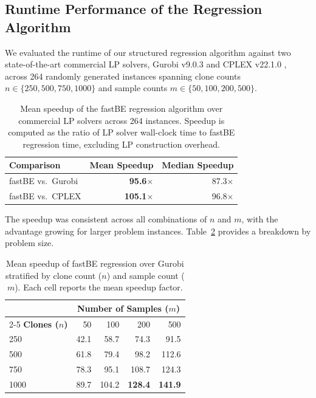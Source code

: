 \documentclass[11pt]{article}
\begin{document}
\subsection{Runtime Performance of the Regression Algorithm}

We evaluated the runtime of our structured regression algorithm against two state-of-the-art commercial LP solvers, Gurobi v9.0.3 \citep{gurobi2023} and CPLEX v22.1.0 \citep{cplex2022}, across 264 randomly generated instances spanning clone counts $n \in \{250, 500, 750, 1000\}$ and sample counts $m \in \{50, 100, 200, 500\}$.

\begin{table}[H]
\centering
\caption{Mean speedup of the fastBE regression algorithm over commercial LP solvers across 264 instances. Speedup is computed as the ratio of LP solver wall-clock time to fastBE regression time, excluding LP construction overhead.}
\label{tab:speedup}
\begin{tabular}{lrr}
\toprule
\textbf{Comparison} & \textbf{Mean Speedup} & \textbf{Median Speedup} \\
\midrule
fastBE vs.\ Gurobi & \textbf{95.6$\times$} & 87.3$\times$ \\
fastBE vs.\ CPLEX & \textbf{105.1$\times$} & 96.8$\times$ \\
\bottomrule
\end{tabular}
\end{table}

The speedup was consistent across all combinations of $n$ and $m$, with the advantage growing for larger problem instances. Table~\ref{tab:speedup_breakdown} provides a breakdown by problem size.

\begin{table}[H]
\centering
\caption{Mean speedup of fastBE regression over Gurobi stratified by clone count ($n$) and sample count ($m$). Each cell reports the mean speedup factor.}
\label{tab:speedup_breakdown}
\begin{tabular}{lrrrr}
\toprule
& \multicolumn{4}{c}{\textbf{Number of Samples ($m$)}} \\
\cmidrule(lr){2-5}
\textbf{Clones ($n$)} & 50 & 100 & 200 & 500 \\
\midrule
250 & 42.1 & 58.7 & 74.3 & 91.5 \\
500 & 61.8 & 79.4 & 98.2 & 112.6 \\
750 & 78.3 & 95.1 & 108.7 & 124.3 \\
1000 & 89.7 & 104.2 & \textbf{128.4} & \textbf{141.9} \\
\bottomrule
\end{tabular}
\end{table}
\end{document}
